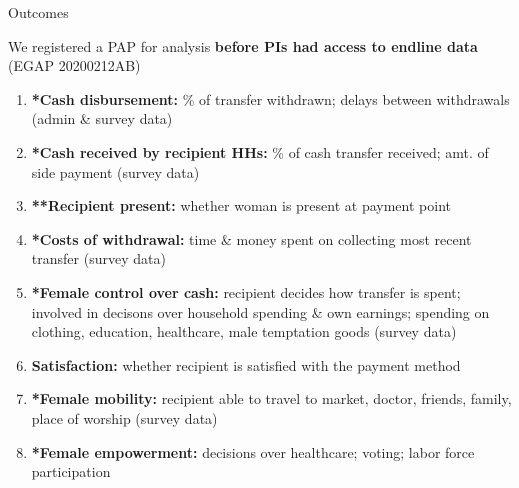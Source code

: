 \documentclass[9pt,english,aspectratio=169,xcolor=table,handout]{beamer}
\begin{document}
\begin{frame}{Outcomes}

We registered a PAP for analysis \textbf{before PIs had access to endline data} (EGAP 20200212AB) 
		
\begin{enumerate}
        \item \textbf{*Cash disbursement:} \% of transfer withdrawn; delays between withdrawals (admin \& survey data)
\pause
\vspace{.2cm}
        \item \textbf{*Cash received by recipient HHs:} \% of cash transfer received; amt. of side payment (survey data) 
\pause
\vspace{.2cm}

        \item \textbf{**Recipient present:} whether woman is present at payment point
\pause
\vspace{.2cm}

        \item \textbf{*Costs of withdrawal:} time \& money spent on collecting most recent transfer (survey data)
\pause
\vspace{.2cm}
        
        \item \textbf{*Female control over cash:} recipient decides how transfer is spent; involved in decisons over household spending \& own earnings; spending on clothing, education, healthcare, male temptation goods (survey data)    
\pause
\vspace{.2cm}

        \item \textbf{Satisfaction:} whether recipient is satisfied with the payment method
\pause
\vspace{.2cm}

        \item \textbf{*Female mobility:} recipient able to travel to market, doctor, friends, family, place of worship (survey data)
\pause
\vspace{.2cm}

        \item \textbf{*Female empowerment:} decisions over healthcare; voting; labor force participation
        
\end{enumerate}
\end{frame}

\end{document}
